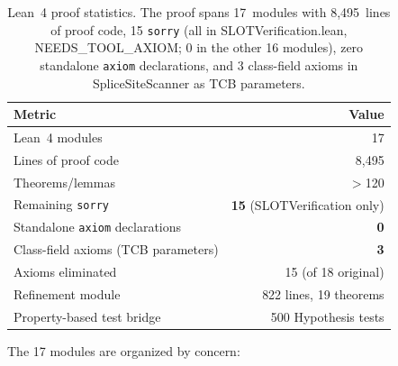 \begin{table}[t]
\centering
\caption{Lean~4 proof statistics. The proof spans 17~modules with
         8{,}495~lines of proof code, 15 \texttt{sorry} (all in SLOTVerification.lean, NEEDS\_TOOL\_AXIOM; 0 in the other 16 modules), zero standalone
         \texttt{axiom} declarations, and 3 class-field axioms in
         SpliceSiteScanner as TCB parameters.}
\label{tab:proofstats}
\begin{tabular}{lr}
\toprule
\textbf{Metric} & \textbf{Value} \\
\midrule
Lean~4 modules & 17 \\
Lines of proof code & 8{,}495 \\
Theorems/lemmas & $>$120 \\
Remaining \texttt{sorry} & \textbf{15} (SLOTVerification only) \\
Standalone \texttt{axiom} declarations & \textbf{0} \\
Class-field axioms (TCB parameters) & \textbf{3} \\
Axioms eliminated & 15 (of 18 original) \\
Refinement module & 822 lines, 19 theorems \\
Property-based test bridge & 500 Hypothesis tests \\
\bottomrule
\end{tabular}
\end{table}

The 17 modules are organized by concern:

